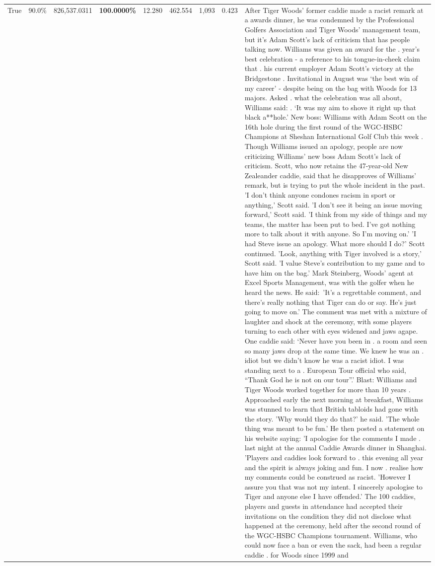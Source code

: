 \begin{table}[H]
\begin{tabular}{lllrlllll}
True & 90.0\% & 826,537.0311 & \bfseries \color{red} 100.0000\% & 12.280 & 462.554 & 1,093 & 0.423 & After Tiger Woods' former caddie made a racist remark at a awards dinner, he was condemned by the Professional Golfers Association and Tiger Woods' management team, but it's Adam Scott's lack of criticism that has people talking now. Williams was given an award for the . year’s best celebration - a reference to his tongue-in-cheek claim that . his current employer Adam Scott’s victory at the Bridgestone . Invitational in August was ‘the best win of my career’ - despite being on the bag with Woods for 13 majors. Asked . what the celebration was all about, Williams said: . ‘It was my aim to shove it right up that black a**hole.’ New boss: Williams with Adam Scott  on the 16th hole during the first round of the WGC-HSBC Champions at Sheshan International Golf Club this week . Though Williams issued an apology, people are now criticizing Williams' new boss Adam Scott's lack of criticism. Scott, who now retains the 47-year-old New Zealeander caddie, said that he disapproves of Williams' remark, but is trying to put the whole incident in the past. 'I don't think anyone condones racism in sport or anything,' Scott said. 'I don't see it being an issue moving forward,' Scott said. 'I think from my side of things and my teams, the matter has been put to bed. I've got nothing more to talk about it with anyone. So I'm moving on.' 'I had Steve issue an apology. What more should I do?' Scott continued. 'Look, anything with Tiger involved is a story,' Scott said. 'I value Steve's contribution to my game and to have him on the bag.' Mark Steinberg, Woods' agent at Excel Sports Management, was with the golfer when he heard the news. He said: 'It's a regrettable comment, and there's really nothing that Tiger can do or say. He's just going to move on.' The comment was met with a mixture of laughter and shock at the ceremony, with some players turning to each other with eyes widened and jaws agape. One caddie said: ‘Never have you been in . a room and seen so many jaws drop at the same time. We knew he was an . idiot but we didn’t know he was a racist idiot. I was standing next to a . European Tour official who said, “Thank God he is not on our tour”.’ Blast: Williams and Tiger Woods worked together for more than 10 years . Approached early the next morning at breakfast, Williams was stunned to learn that British tabloids had gone with the story. 'Why would they do that?' he said. 'The whole thing was meant to be fun.' He then posted a statement on his website saying: 'I apologise for the comments I made . last night at the annual Caddie Awards dinner in Shanghai. 'Players and caddies look forward to . this evening all year and the spirit is always joking and fun. I now . realise how my comments could be construed as racist. 'However I assure you that was not my intent. I sincerely apologise to Tiger and anyone else I have offended.' The 100 caddies, players and guests in attendance had accepted their invitations on the condition they did not disclose what happened at the ceremony, held after the second round of the WGC-HSBC Champions tournament. Williams, who could now face a ban or even the sack, had been a regular caddie . for Woods since 1999 and 
\end{tabular}
\end{table}
